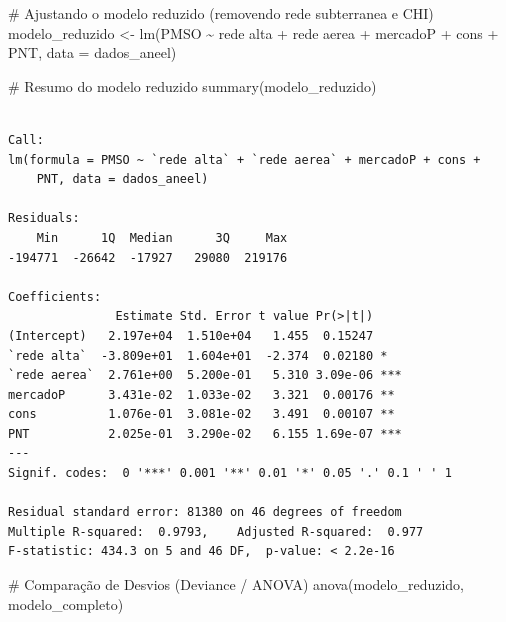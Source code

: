 \documentclass[
  letterpaper,
]{article}
\newenvironment{Shaded}{\begin{snugshade}}{\end{snugshade}}
\newcommand{\AttributeTok}[1]{\textcolor[rgb]{0.40,0.45,0.13}{#1}}
\newcommand{\CommentTok}[1]{\textcolor[rgb]{0.37,0.37,0.37}{#1}}
\newcommand{\FunctionTok}[1]{\textcolor[rgb]{0.28,0.35,0.67}{#1}}
\newcommand{\NormalTok}[1]{\textcolor[rgb]{0.00,0.23,0.31}{#1}}
\newcommand{\OtherTok}[1]{\textcolor[rgb]{0.00,0.23,0.31}{#1}}
\newcommand{\SpecialCharTok}[1]{\textcolor[rgb]{0.37,0.37,0.37}{#1}}
\newcommand{\StringTok}[1]{\textcolor[rgb]{0.13,0.47,0.30}{#1}}
\begin{document}
\begin{Shaded}
\begin{Highlighting}[]
\CommentTok{\# Ajustando o modelo reduzido (removendo \textquotesingle{}rede subterranea\textquotesingle{} e \textquotesingle{}CHI\textquotesingle{})}
\NormalTok{modelo\_reduzido }\OtherTok{\textless{}{-}} \FunctionTok{lm}\NormalTok{(PMSO }\SpecialCharTok{\textasciitilde{}} \StringTok{\textasciigrave{}}\AttributeTok{rede alta}\StringTok{\textasciigrave{}} \SpecialCharTok{+} \StringTok{\textasciigrave{}}\AttributeTok{rede aerea}\StringTok{\textasciigrave{}} \SpecialCharTok{+}\NormalTok{ mercadoP }\SpecialCharTok{+}\NormalTok{ cons }\SpecialCharTok{+}\NormalTok{ PNT, }
                      \AttributeTok{data =}\NormalTok{ dados\_aneel)}

\CommentTok{\# Resumo do modelo reduzido}
\FunctionTok{summary}\NormalTok{(modelo\_reduzido)}
\end{Highlighting}
\end{Shaded}

\begin{verbatim}

Call:
lm(formula = PMSO ~ `rede alta` + `rede aerea` + mercadoP + cons + 
    PNT, data = dados_aneel)

Residuals:
    Min      1Q  Median      3Q     Max 
-194771  -26642  -17927   29080  219176 

Coefficients:
               Estimate Std. Error t value Pr(>|t|)    
(Intercept)   2.197e+04  1.510e+04   1.455  0.15247    
`rede alta`  -3.809e+01  1.604e+01  -2.374  0.02180 *  
`rede aerea`  2.761e+00  5.200e-01   5.310 3.09e-06 ***
mercadoP      3.431e-02  1.033e-02   3.321  0.00176 ** 
cons          1.076e-01  3.081e-02   3.491  0.00107 ** 
PNT           2.025e-01  3.290e-02   6.155 1.69e-07 ***
---
Signif. codes:  0 '***' 0.001 '**' 0.01 '*' 0.05 '.' 0.1 ' ' 1

Residual standard error: 81380 on 46 degrees of freedom
Multiple R-squared:  0.9793,    Adjusted R-squared:  0.977 
F-statistic: 434.3 on 5 and 46 DF,  p-value: < 2.2e-16
\end{verbatim}

\begin{Shaded}
\begin{Highlighting}[]
\CommentTok{\# Comparação de Desvios (Deviance / ANOVA)}
\FunctionTok{anova}\NormalTok{(modelo\_reduzido, modelo\_completo)}
\end{Highlighting}
\end{Shaded}
\end{document}
